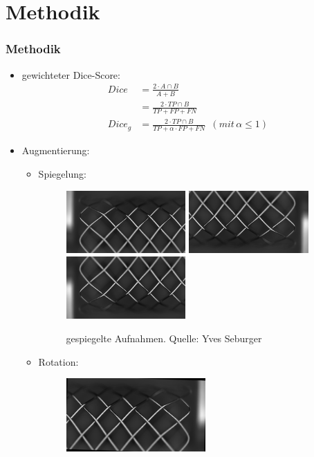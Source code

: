 \documentclass{beamer}
\begin{document}
\section{Methodik}
\begin{frame}[allowframebreaks]
\frametitle{Methodik}
\begin{itemize}
    \item gewichteter Dice-Score:\\
    \begin{equation}
        \begin{split}
            Dice &= \frac{2 \cdot A \cap B}{A + B}\\
            &= \frac{2 \cdot TP \cap B}{TP + FP + FN}\\
            Dice_g &= \frac{2 \cdot TP \cap B}{TP + \alpha \cdot FP + FN}
            \,\,\,(mit\, \alpha \leq 1)
        \end{split}
    \end{equation}
    \framebreak
    \item Augmentierung:
    \begin{itemize}
        \item Spiegelung:
        \begin{figure}
            \includegraphics[height=2.4cm]{Bilder/Augmentation/mlr.jpg}
            \includegraphics[height=2.4cm]{Bilder/Augmentation/mtb.jpg}
            \includegraphics[height=2.4cm]{Bilder/Augmentation/mtlr.jpg}
            \caption{gespiegelte Aufnahmen. \scriptsize{Quelle: Yves Seburger}}
        \end{figure} 
        \item Rotation:
        \begin{figure}
            \includegraphics[height=2.8cm]{Bilder/Augmentation/-2grad.jpg}

\end{figure}
\end{itemize}
\end{itemize}
\end{frame}
\end{document}
